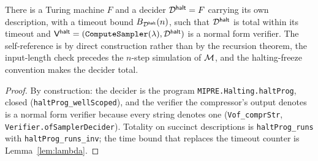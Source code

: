 \begin{lemma}
\label{lem:halt-construction}
\leanok
There is a Turing machine $F$ and a decider $\mathcal{D}^{\mathsf{halt}} = F$ carrying its own description,
with a timeout bound $B_{\mathcal{D}^{\mathsf{halt}}}(n)$, such that $\mathcal{D}^{\mathsf{halt}}$ is total within its timeout and
$\mathsf{V}^{\mathsf{halt}} = (\mathtt{ComputeSampler}(\lambda), \mathcal{D}^{\mathsf{halt}})$ is a normal form verifier. The
self-reference is by direct construction rather than by the recursion theorem, the
input-length check precedes the $n$-step simulation of $\mathcal{M}$, and the
halting-freeze convention makes the decider total.
\end{lemma}

\begin{proof}
\leanok
By construction: the decider is the program \texttt{MIPRE.Halting.haltProg}, closed
(\texttt{haltProg\_wellScoped}), and the verifier the compressor's output denotes is a normal
form verifier because every string denotes one (\texttt{Vof\_comprStr},
\texttt{Verifier.ofSamplerDecider}). Totality on succinct descriptions is
\texttt{haltProg\_runs} with \texttt{haltProg\_runs\_inv}; the time bound that replaces the
timeout counter is Lemma~\ref{lem:lambda}.
\end{proof}

